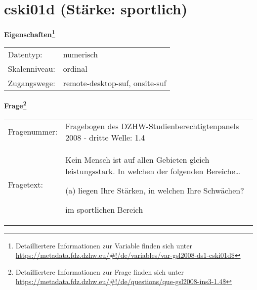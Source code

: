 
    \setcounter{footnote}{0}

    \vspace*{-1.8cm}
	\section{cski01d (Stärke: sportlich)}
	\label{section:cski01d}



    \vspace*{0.5cm}
    \noindent\textbf{Eigenschaften\footnote{Detailliertere Informationen zur Variable finden sich unter
		\url{https://metadata.fdz.dzhw.eu/\#!/de/variables/var-gsl2008-ds1-cski01d$}}}\\
	\begin{tabularx}{\hsize}{@{}lX}
	Datentyp: & numerisch \\
	Skalenniveau: & ordinal \\
	Zugangswege: &
	  remote-desktop-suf, 
	  onsite-suf
 \\
    \end{tabularx}



				\vspace*{0.5cm}
                \noindent\textbf{Frage\footnote{Detailliertere Informationen zur Frage finden sich unter
		              \url{https://metadata.fdz.dzhw.eu/\#!/de/questions/que-gsl2008-ins3-1.4$}}}\\
				\begin{tabularx}{\hsize}{@{}lX}
					Fragenummer: &
					  Fragebogen des DZHW-Studienberechtigtenpanels 2008 - dritte Welle:
					  1.4
 \\
					Fragetext: & Kein Mensch ist auf allen Gebieten gleich leistungsstark. In welchen der folgenden Bereiche…\par  (a) liegen Ihre Stärken, in welchen Ihre Schwächen?\par  im sportlichen Bereich \\
				\end{tabularx}





